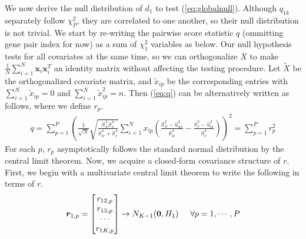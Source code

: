 \documentclass[aap, preprint]{imsart}
\numberwithin{equation}{section}
\theoremstyle{plain}
\begin{document}
We now derive the null distribution of $d_1$ to test (\ref{eq:globalnull}). Although ${q}_{1k}$ separately follow $\chi_{P}^2$, they are correlated to one another, so their null distribution is not trivial. We start by re-writing the pairwise score statistic $q$ (ommitting gene pair index for now) as a sum of $\chi_1^2$ variables as below. Our null hypothesis tests for all covariates at the same time, so we can orthogonalize $X$ to make $\frac{1}{N} \sum_{i=1}^{N} \bm{x}_i \bm{x}_i^T$ an identity matrix without affecting the testing procedure. Let $\tilde{X}$ be the orthogonalized covariate matrix, and $\tilde{x}_{ip}$ be the corresponding entries with $\sum_{i=1}^{N}\tilde{x}_{ip} = 0$ and $\sum_{i=1}^{N} \tilde{x}_{ip}^2  = n$. Then (\ref{eq:q}) can be alternatively written as follows, where we define $r_{p}.$
\begin{align}
q = \sum_{p=1}^{P}
 \left(\frac{1}{\sqrt{N}}
 \sqrt{\frac{\hat{\sigma}_w^4 \hat{\sigma}_v^4}{\hat{\sigma}_w^4 + \hat{\sigma}_v^4}}
 \sum_{i=1}^{N} x_{ip} \left( \frac{\hat{\sigma}_w^2 - \hat{u}_{wi}^2}{\hat{\sigma}_w^4}
 - \frac{\hat{\sigma}_v^2 - \hat{u}_{vi}^2}{\hat{\sigma}_v^4}
 \right)
\right)^2 = \sum_{p=1}^{P}r_p^2
\label{eq:r}
\end{align}
For each $p$, $r_p$ asymptotically follows the standard normal distribution by the central limit theorem. 
 Now, we acquire a closed-form covariance structure of $r$. First, we begin with a multivariate central limit theorem to write the following in terms of $r$.
\begin{equation}
\bm{r}_{1,p} = \begin{bmatrix}
r_{12,p} \\ r_{13, p} \\ \cdots \\ r_{1K,p}
\end{bmatrix}  \rightarrow N_{K-1}(\bm{0}, H_1) \hspace{5mm} \forall p = 1, \cdots, P
\label{eq:H}
\end{equation}
\end{document}
